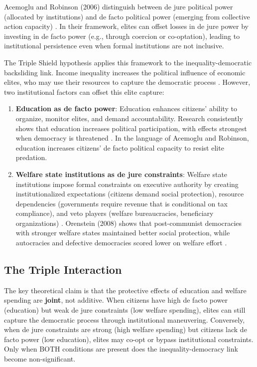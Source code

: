 \documentclass[11pt,letterpaper]{article}
\begin{document}
Acemoglu and Robinson (2006) distinguish between de jure political power (allocated by institutions) and de facto political power (emerging from collective action capacity) \cite{Acemoglu2006}. In their framework, elites can offset losses in de jure power by investing in de facto power (e.g., through coercion or co-optation), leading to institutional persistence even when formal institutions are not inclusive.

The Triple Shield hypothesis applies this framework to the inequality-democratic backsliding link. Income inequality increases the political influence of economic elites, who may use their resources to capture the democratic process \cite{Rau2024}. However, two institutional factors can offset this elite capture:

\begin{enumerate}
    \item \textbf{Education as de facto power}: Education enhances citizens' ability to organize, monitor elites, and demand accountability. Research consistently shows that education increases political participation, with effects strongest when democracy is threatened \cite{Rosenstone1993, Milligan2004}. In the language of Acemoglu and Robinson, education increases citizens' de facto political capacity to resist elite predation.
    
    \item \textbf{Welfare state institutions as de jure constraints}: Welfare state institutions impose formal constraints on executive authority by creating institutionalized expectations (citizens demand social protection), resource dependencies (governments require revenue that is conditional on tax compliance), and veto players (welfare bureaucracies, beneficiary organizations) \cite{Orenstein2008, Haggard2021}. Orenstein (2008) shows that post-communist democracies with stronger welfare states maintained better social protection, while autocracies and defective democracies scored lower on welfare effort \cite{Orenstein2008}.
\end{enumerate}

\subsection{The Triple Interaction}

The key theoretical claim is that the protective effects of education and welfare spending are \textbf{joint}, not additive. When citizens have high de facto power (education) but weak de jure constraints (low welfare spending), elites can still capture the democratic process through institutional maneuvering. Conversely, when de jure constraints are strong (high welfare spending) but citizens lack de facto power (low education), elites may co-opt or bypass institutional constraints. Only when BOTH conditions are present does the inequality-democracy link become non-significant.
\end{document}
